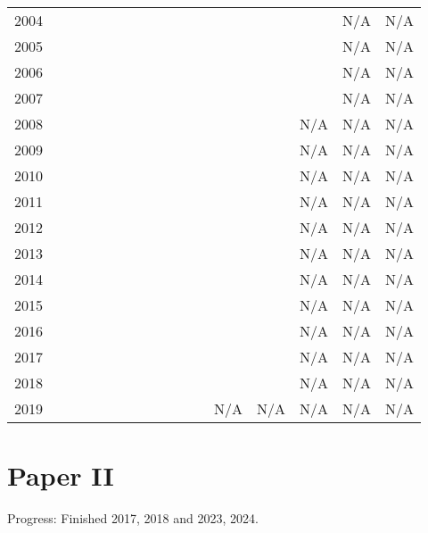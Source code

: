 \begin{center}
\begin{tabular}{c|cccccccccccccccc}
        2004 &   &   &   &   &   &   &   &   &   &    &    &     &     &     & N/A & N/A \\
        2005 &   &   &   &   &   &   &   &   &   &    &    &     &     &     & N/A & N/A \\
        2006 &   &   &   &   &   &   &   &   &   &    &    &     &     &     & N/A & N/A \\
        2007 &   &   &   &   &   &   &   &   &   &    &    &     &     &     & N/A & N/A \\
        2008 &   &   &   &   &   &   &   &   &   &    &    &     &     & N/A & N/A & N/A \\
        2009 &   &   &   &   &   &   &   &   &   &    &    &     &     & N/A & N/A & N/A \\
        2010 &   &   &   &   &   &   &   &   &   &    &    &     &     & N/A & N/A & N/A \\
        2011 &   &   &   &   &   &   &   &   &   &    &    &     &     & N/A & N/A & N/A \\
        2012 &   &   &   &   &   &   &   &   &   &    &    &     &     & N/A & N/A & N/A \\
        2013 &   &   &   &   &   &   &   &   &   &    &    &     &     & N/A & N/A & N/A \\
        2014 &   &   &   &   &   &   &   &   &   &    &    &     &     & N/A & N/A & N/A \\
        2015 &   &   &   &   &   &   &   &   &   &    &    &     &     & N/A & N/A & N/A \\
        2016 &   &   &   &   &   &   &   &   &   &    &    &     &     & N/A & N/A & N/A \\
        2017 &   &   &   &   &   &   &   &   &   &    &    &     &     & N/A & N/A & N/A \\
        2018 &   &   &   &   &   &   &   &   &   &    &    &     &     & N/A & N/A & N/A \\
        2019 &   &   &   &   &   &   &   &   &   &    &    & N/A & N/A & N/A & N/A & N/A
    \end{tabular}
\end{center}

\clearpage
\section*{Paper II}
Progress: Finished 2017, 2018 and 2023, 2024.

